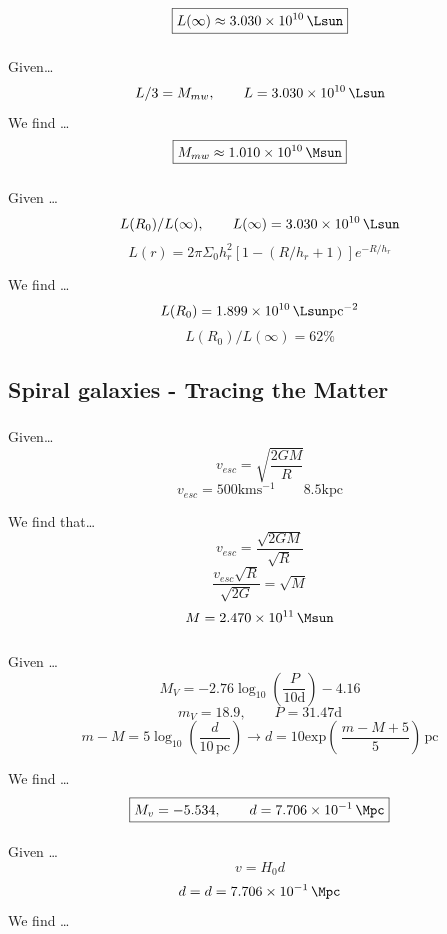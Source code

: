 \documentclass{article}
\begin{document}
\[\boxed{L(\infty) \approx \SI{3.030e+10}{\Lsun}}\]

\subsubsection{}
Given\dots 
\[L/3 = M_{mw}, \qquad L = \SI{3.030e+10}{\Lsun}\]
We find \dots
\[\boxed{M_{mw} \approx\SI{1.010e+10}{\Msun}}\]

\subsubsection{}
Given \dots
\[L(R_0)/L(\infty), \qquad L(\infty) = \SI{3.030e+10}{\Lsun}\]
\[ L(r) = 2\pi \Sigma_0 h_r^2\left[1 - (R/h_r +1 ) \right]e^{-R/h_r}\]

We find \dots
\[L(R_0) = \SI{1.899e+10}{\Lsun} \text{pc}^{-2}\]
\[L(R_0)/L(\infty) = 62\% \]



\subsection{Spiral galaxies - Tracing the Matter}
\subsubsection{}

Given\dots
\[v_{esc} = \sqrt{\frac{2GM}{R}}\]
\[v_{esc} = 500 \text{km} \text{s}^{-1} \qquad 8.5 \text{kpc}\]

We find that\dots
\[v_{esc} = \frac{\sqrt{2GM}}{\sqrt{R}}\]
\[\frac{v_{esc}\sqrt{R}}{\sqrt{2G}} = \sqrt{M}\]
\[M = \SI{2.470e+11}{\Msun}\]

\subsubsection{}
\paragraph{}

Given \dots
\[M_V = -2.76 \log_{10}\left(\frac{P}{10\si{\day}}\right) - 4.16\]
\[m_V = 18.9, \qquad P = 31.47 \si{\day}\]
\[m - M = 5 \log_{10}\!\left(\frac{d}{10\,\text{pc}}\right) \rightarrow d = 10 \text{exp}\left({\,\frac{m - M + 5}{5}}\right) \,\text{pc}\]


We find \dots
\[\boxed{M_v = -5.534, \qquad d = \SI{7.706e-01}{\Mpc}}\]

\paragraph{}
Given \dots
\[v = H_0 d\]
\[d = d = \SI{7.706e-01}{\Mpc}\]
We find \dots
\end{document}
